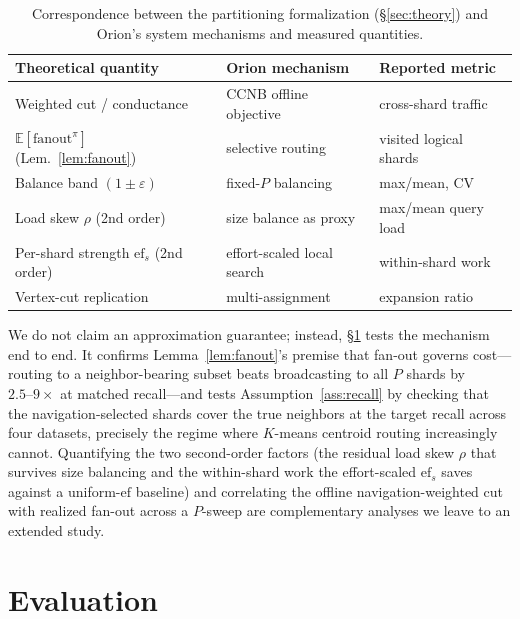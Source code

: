 \begin{table}[t]
\centering
\small
\begin{tabular}{@{}lll@{}}
\toprule
Theoretical quantity & Orion mechanism & Reported metric \\
\midrule
Weighted cut / conductance & CCNB offline objective & cross-shard traffic \\
$\mathbb{E}[\mathrm{fanout}^\pi]$ (Lem.~\ref{lem:fanout}) & selective routing & visited logical shards \\
Balance band $(1{\pm}\varepsilon)$ & fixed-$P$ balancing & max/mean, CV \\
Load skew $\rho$ (2nd order) & size balance as proxy & max/mean query load \\
Per-shard strength $\mathrm{ef}_s$ (2nd order) & effort-scaled local search & within-shard work \\
Vertex-cut replication & multi-assignment & expansion ratio \\
\bottomrule
\end{tabular}
\caption{Correspondence between the partitioning formalization
(\S\ref{sec:theory}) and Orion's system mechanisms and measured quantities.}
\label{tab:theory-map}
\end{table}

We do not claim an approximation guarantee; instead, \S\ref{sec:eval} tests the
mechanism end to end. It confirms Lemma~\ref{lem:fanout}'s premise that fan-out
governs cost---routing to a neighbor-bearing subset beats broadcasting to all $P$
shards by $2.5\text{--}9\times$ at matched recall---and tests
Assumption~\ref{ass:recall} by checking that the navigation-selected shards cover
the true neighbors at the target recall across four datasets, precisely the regime
where $K$-means centroid routing increasingly cannot. Quantifying the two
second-order factors (the residual load skew $\rho$ that survives size balancing
and the within-shard work the effort-scaled $\mathrm{ef}_s$ saves against a
uniform-$\mathrm{ef}$ baseline) and correlating the offline navigation-weighted
cut with realized fan-out across a $P$-sweep are complementary analyses we leave
to an extended study.

\section{Evaluation}
\label{sec:eval}

